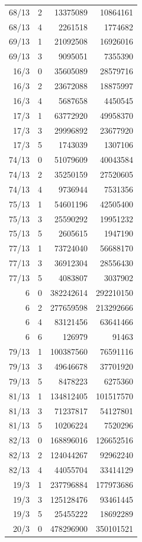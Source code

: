 \begin{longtable}{@{}rrrr@{}}
68/13 & 2 & 13375089 & 10864161\\
68/13 & 4 & 2261518 & 1774682\\
69/13 & 1 & 21092508 & 16926016\\
69/13 & 3 & 9095051 & 7355390\\
16/3 & 0 & 35605089 & 28579716\\
16/3 & 2 & 23672088 & 18875997\\
16/3 & 4 & 5687658 & 4450545\\
17/3 & 1 & 63772920 & 49958370\\
17/3 & 3 & 29996892 & 23677920\\
17/3 & 5 & 1743039 & 1307106\\
74/13 & 0 & 51079609 & 40043584\\
74/13 & 2 & 35250159 & 27520605\\
74/13 & 4 & 9736944 & 7531356\\
75/13 & 1 & 54601196 & 42505400\\
75/13 & 3 & 25590292 & 19951232\\
75/13 & 5 & 2605615 & 1947190\\
77/13 & 1 & 73724040 & 56688170\\
77/13 & 3 & 36912304 & 28556430\\
77/13 & 5 & 4083807 & 3037902\\
6 & 0 & 382242614 & 292210150\\
6 & 2 & 277659598 & 213292666\\
6 & 4 & 83121456 & 63641466\\
6 & 6 & 126979 & 91463\\
79/13 & 1 & 100387560 & 76591116\\
79/13 & 3 & 49646678 & 37701920\\
79/13 & 5 & 8478223 & 6275360\\
81/13 & 1 & 134812405 & 101517570\\
81/13 & 3 & 71237817 & 54127801\\
81/13 & 5 & 10206224 & 7520296\\
82/13 & 0 & 168896016 & 126652516\\
82/13 & 2 & 124044267 & 92962240\\
82/13 & 4 & 44055704 & 33414129\\
19/3 & 1 & 237796884 & 177973686\\
19/3 & 3 & 125128476 & 93461445\\
19/3 & 5 & 25455222 & 18692289\\
20/3 & 0 & 478296900 & 350101521\\

\end{longtable}
